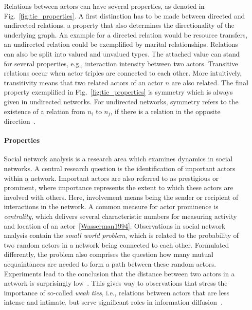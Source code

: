 Relations between actors can have several properties, as denoted in Fig.~\ref{fig:tie_properties}.
A first distinction has to be made between directed and undirected relations,
a property that also determines the directionality of the underlying graph.
An example for a directed relation would be resource transfers, an undirected
relation could be exemplified by marital relationships.
Relations can also be split into valued and unvalued types.
The attached value can stand for several properties, e.g., interaction intensity
between two actors.
Transitive relations occur when actor triples are connected to each other.
More intuitively, transitivity means that two related actors of an actor $n$ are
also related.
The final property exemplified in Fig.~\ref{fig:tie_properties} is symmetry which
is always given in undirected networks.
For undirected networks, symmetry refers to the existence of a relation from
$n_i$ to $n_j$, if there is a relation in the opposite direction~\cite{Wasserman1994}.

\paragraph{Properties}

Social network analysis is a research area which examines dynamics in social
networks.
A central research question is the identification of important actors within
a network.
Important actors are also referred to as prestigious or prominent, where importance
represents the extent to which these actors are involved with others.
Here, involvement means being the sender or recipient of interactions in the
network.
A common measure for actor prominence is \textit{centrality}, which delivers
several characteristic numbers for measuring activity and location of an actor~\ref{Wasserman1994}.
Observations in social network analysis contain the \textit{small world problem},
which is related to the probability of two random actors in a network being
connected to each other.
Formulated differently, the problem also comprises the question how many
mutual acquaintances are needed to form a path between these random actors.
Experiments lead to the conclusion that the distance between two actors in
a network is surprisingly low~\cite{Travers1969}.
This gives way to observations that stress the importance of so-called
\textit{weak ties}, i.e., relations between actors that are less intense and
intimate, but serve significant roles in information diffusion~\cite{Granovetter1973}.

